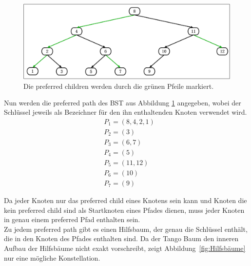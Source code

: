 \documentclass[a4paper,12pt]{article}
\begin{document}
\begin{figure}[H]
	\centering
	\includegraphics[width=1\textwidth]{Medien/Tango/prefChilds}
	\caption{Die preferred children werden durch die grünen Pfeile markiert. }
	\label{fig:prefChilds}
\end{figure}

\noindent Nun werden die preferred path des BST aus Abbildung \ref{fig:prefChilds} angegeben, wobei der Schlüssel jeweils als Bezeichner für den ihn enthaltenden Knoten verwendet wird.
\begin{align*}
&P_1 =  \left( 8, 4, 2,1 \right) \\
&P_2 = \left(3 \right)\\
&P_3 = \left(6, 7 \right)\\
&P_4 = \left(5 \right)\\
&P_5 = \left(11, 12 \right) \\
&P_6 = \left(10 \right)\\
&P_7 = \left(9\right)
\end{align*}

\noindent Da jeder Knoten nur das preferred child eines Knotens sein kann und Knoten die kein preferred child sind als Startknoten eines Pfades dienen, muss jeder Knoten in genau einem preferred Pfad enthalten sein.\\
Zu jedem preferred path gibt es einen Hilfsbaum, der genau die Schlüssel enthält, die in den Knoten des Pfades enthalten sind. Da der Tango Baum den inneren Aufbau der Hilfsbäume nicht exakt vorschreibt, zeigt \mbox{Abbildung \ref{fig:Hilfsbäume}} nur eine mögliche Konstellation.
\end{document}
